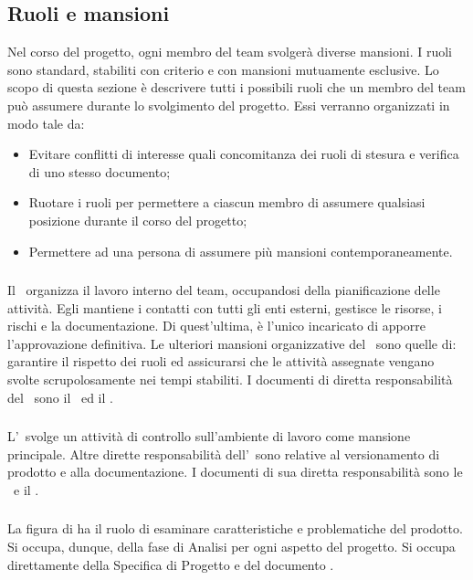 	\subsection{Ruoli e mansioni}
	Nel corso del progetto, ogni membro del team svolgerà diverse mansioni. I ruoli sono standard, stabiliti con criterio e con mansioni mutuamente esclusive. Lo scopo di questa sezione è descrivere tutti i possibili ruoli che un membro del team può assumere durante lo svolgimento del progetto. Essi verranno organizzati in modo tale da:
	\begin{itemize}
		\item Evitare conflitti di interesse quali concomitanza dei ruoli di stesura e verifica di uno stesso documento;
		\item Ruotare i ruoli per permettere a ciascun membro di assumere qualsiasi posizione durante il corso del progetto;
		\item Permettere ad una persona di assumere più mansioni contemporaneamente.
	\end{itemize}

		\subsubsection{\RdP}
		Il \RdP\ organizza il lavoro interno del team, occupandosi della pianificazione delle attività. Egli mantiene i contatti con tutti gli enti esterni, gestisce le risorse, i rischi e la documentazione. Di quest'ultima, è l'unico incaricato di apporre l'approvazione definitiva. Le ulteriori mansioni organizzative del \RdP\ sono quelle di: garantire il rispetto dei ruoli ed assicurarsi che le attività assegnate vengano svolte scrupolosamente nei tempi stabiliti. I documenti di diretta responsabilità del \RdP\ sono il \PdP\ ed il \PdQ.

		\subsubsection{\Amm}
		L'\Amm\ svolge un attività di controllo sull'ambiente di lavoro come mansione principale. Altre dirette responsabilità dell'\Amm\ sono relative al versionamento di prodotto e alla documentazione. I documenti di sua diretta responsabilità sono le \NdP\ e il \PdP.
		
		\subsubsection{\Ana}
		La figura di \Ana ha il ruolo di esaminare caratteristiche e problematiche del prodotto. Si occupa, dunque, della fase di Analisi per ogni aspetto del progetto. Si occupa direttamente della Specifica di Progetto e del documento \AdR.

